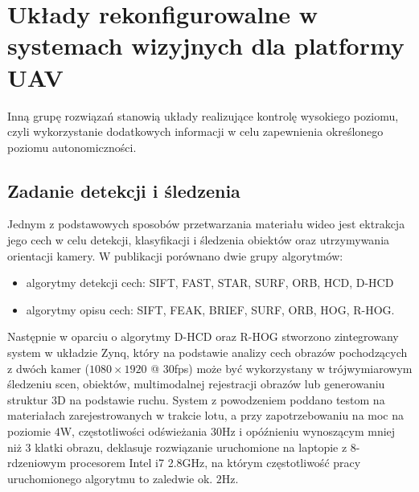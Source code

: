 \section{Układy rekonfigurowalne w systemach wizyjnych dla platformy UAV}

Inną grupę rozwiązań stanowią układy realizujące kontrolę wysokiego poziomu, czyli wykorzystanie dodatkowych informacji w celu zapewnienia określonego poziomu autonomiczności.
 
\subsection{Zadanie detekcji i śledzenia}
Jednym z podstawowych sposobów przetwarzania materiału wideo jest ektrakcja jego cech w celu detekcji, klasyfikacji i śledzenia obiektów oraz utrzymywania orientacji kamery. W publikacji \cite{RHOG} porównano dwie grupy algorytmów:
\begin{itemize}
	\item algorytmy detekcji cech: SIFT, FAST, STAR, SURF, ORB, HCD, D-HCD
	\item algorytmy opisu cech: SIFT, FEAK, BRIEF, SURF, ORB, HOG, R-HOG.
\end{itemize} 
Następnie w oparciu o algorytmy D-HCD oraz R-HOG stworzono zintegrowany system w układzie Zynq, który na podstawie analizy cech obrazów pochodzących z dwóch kamer ($1080\times 1920$ @ $30$fps) może być wykorzystany w trójwymiarowym śledzeniu scen, obiektów, multimodalnej rejestracji obrazów lub generowaniu struktur 3D na podstawie ruchu. System z powodzeniem poddano testom na materiałach zarejestrowanych w trakcie lotu, a przy zapotrzebowaniu na moc na poziomie $4$W, częstotliwości odświeżania $30$Hz i opóźnieniu wynoszącym mniej niż $3$ klatki obrazu, deklasuje rozwiązanie uruchomione na laptopie z 8-rdzeniowym procesorem Intel i7 2.8GHz, na którym częstotliwość pracy uruchomionego algorytmu to zaledwie ok. $2$Hz.


